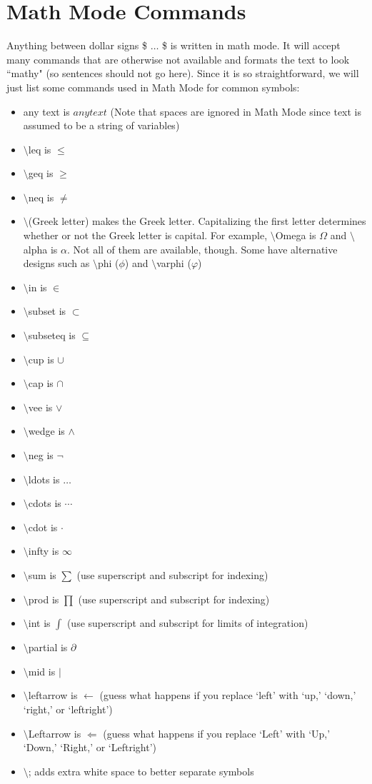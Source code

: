 \documentclass[10pt]{article}
\begin{document}
\section{Math Mode Commands\label{mathModeCmds}}
Anything between dollar signs \$ $ \ldots $ \$ is written in math mode.  It will accept many commands that are otherwise not available and formats the text to look ``mathy" (so sentences should not go here).  Since it is so straightforward, we will just list some commands used in Math Mode for common symbols:
\begin{itemize}
\item any text is $ any text $ (Note that spaces are ignored in Math Mode since text is assumed to be a string of variables)
\item $ \setminus $leq is $ \leq $
\item $ \setminus $geq is $ \geq $
\item $ \setminus $neq is $ \neq $
\item $ \setminus $(Greek letter) makes the Greek letter.  Capitalizing the first letter determines whether or not the Greek letter is capital.  For example, $ \setminus $Omega is $ \Omega $ and $ \setminus $alpha is $ \alpha $.  Not all of them are available, though.  Some have alternative designs such as $ \setminus $phi ($ \phi $) and $ \setminus $varphi ($ \varphi $)
\item $ \setminus $in is $ \in $
\item $ \setminus $subset is $ \subset $
\item $ \setminus $subseteq is $ \subseteq $
\item $ \setminus $cup is $ \cup $
\item $ \setminus $cap is $ \cap $
\item $ \setminus $vee is $ \vee $
\item $ \setminus $wedge is $ \wedge $
\item $ \setminus $neg is $ \neg $
\item $ \setminus $ldots is $ \ldots $
\item $ \setminus $cdots is $ \cdots $
\item $ \setminus $cdot is $ \cdot $
\item $ \setminus $infty is $ \infty $
\item $ \setminus $sum is $ \sum $ (use superscript and subscript for indexing)
\item $ \setminus $prod is $ \prod $ (use superscript and subscript for indexing)
\item $ \setminus $int is $ \int $ (use superscript and subscript for limits of integration)
\item $ \setminus $partial is $ \partial $
\item $ \setminus $mid is $ \mid $
\item $ \setminus $leftarrow is $ \leftarrow $ (guess what happens if you replace `left' with `up,' `down,' `right,' or `leftright')
\item $ \setminus $Leftarrow is $ \Leftarrow $ (guess what happens if you replace `Left' with `Up,' `Down,' `Right,' or `Leftright')
\item $ \setminus $; adds extra white space to better separate symbols
\end{itemize}
\end{document}
